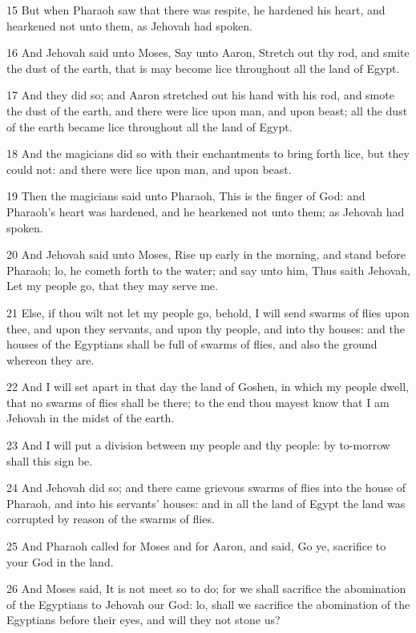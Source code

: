 \par 15 But when Pharaoh saw that there was respite, he hardened his heart, and hearkened not unto them, as Jehovah had spoken.
\par 16 And Jehovah said unto Moses, Say unto Aaron, Stretch out thy rod, and smite the dust of the earth, that is may become lice throughout all the land of Egypt.
\par 17 And they did so; and Aaron stretched out his hand with his rod, and smote the dust of the earth, and there were lice upon man, and upon beast; all the dust of the earth became lice throughout all the land of Egypt.
\par 18 And the magicians did so with their enchantments to bring forth lice, but they could not: and there were lice upon man, and upon beast.
\par 19 Then the magicians said unto Pharaoh, This is the finger of God: and Pharaoh's heart was hardened, and he hearkened not unto them; as Jehovah had spoken.
\par 20 And Jehovah said unto Moses, Rise up early in the morning, and stand before Pharaoh; lo, he cometh forth to the water; and say unto him, Thus saith Jehovah, Let my people go, that they may serve me.
\par 21 Else, if thou wilt not let my people go, behold, I will send swarms of flies upon thee, and upon they servants, and upon thy people, and into thy houses: and the houses of the Egyptians shall be full of swarms of flies, and also the ground whereon they are.
\par 22 And I will set apart in that day the land of Goshen, in which my people dwell, that no swarms of flies shall be there; to the end thou mayest know that I am Jehovah in the midst of the earth.
\par 23 And I will put a division between my people and thy people: by to-morrow shall this sign be.
\par 24 And Jehovah did so; and there came grievous swarms of flies into the house of Pharaoh, and into his servants' houses: and in all the land of Egypt the land was corrupted by reason of the swarms of flies.
\par 25 And Pharaoh called for Moses and for Aaron, and said, Go ye, sacrifice to your God in the land.
\par 26 And Moses said, It is not meet so to do; for we shall sacrifice the abomination of the Egyptians to Jehovah our God: lo, shall we sacrifice the abomination of the Egyptians before their eyes, and will they not stone us?

